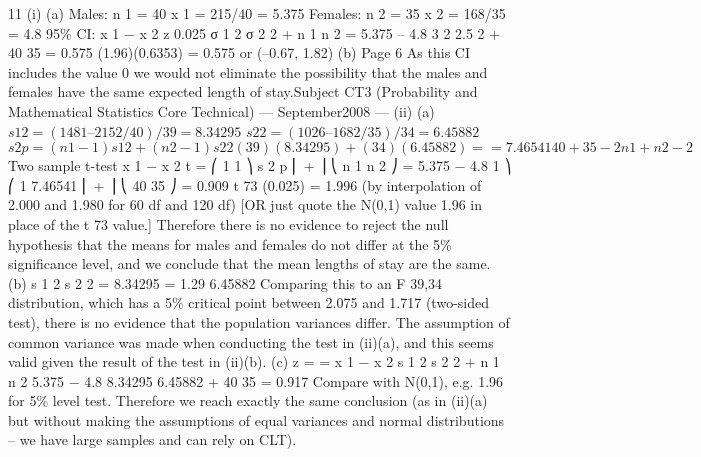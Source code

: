 \documentclass[a4paper,12pt]{article}
\begin{document}
11
(i)
(a)
Males: n 1 = 40
x 1 = 215/40 = 5.375
Females: n 2 = 35 x 2 = 168/35 = 4.8
95\% CI:
x 1 − x 2 \pm z 0.025
σ 1 2 σ 2 2
+
n 1 n 2
= 5.375 – 4.8 
3 2 2.5 2
+
40 35
= 0.575 \pm (1.96)(0.6353)
= 0.575  or (–0.67, 1.82)
(b)
Page 6
As this CI includes the value 0 we would not eliminate the possibility
that the males and females have the same expected length of stay.Subject CT3 (Probability and Mathematical Statistics Core Technical) — September2008 — %
(ii)
(a)
$s 1 2 = (1481 – 215 2 /40)/39 = 8.34295$
$s 2 2 = (1026 – 168 2 /35)/34 = 6.45882$
$s 2 p =
( n 1 − 1) s 1 2 + ( n 2 − 1) s 2 2
(39)(8.34295) + (34)(6.45882)
=
= 7.46541
40 + 35 − 2
n 1 + n 2 − 2$
Two sample t-test
x 1 − x 2
t =
⎛ 1 1 ⎞
s 2 p ⎜ + ⎟
⎝ n 1 n 2 ⎠
=
5.375 − 4.8
1 ⎞
⎛ 1
7.46541 ⎜ + ⎟
⎝ 40 35 ⎠
= 0.909
t 73 (0.025) = 1.996 (by interpolation of 2.000 and 1.980 for 60 df and
120 df)
[OR just quote the N(0,1) value 1.96 in place of the t 73 value.]
Therefore there is no evidence to reject the null hypothesis that the means for males and females do not differ at the 5\% significance level,
and we conclude that the mean lengths of stay are the same.
(b)
s 1 2
s 2 2
=
8.34295
= 1.29
6.45882
Comparing this to an F 39,34 distribution, which has a 5\% critical point between 2.075 and 1.717 (two-sided test), there is no evidence that the population variances differ.
The assumption of common variance was made when conducting the test in (ii)(a), and this seems valid given the result of the test in (ii)(b).
(c)
z =
=
x 1 − x 2
s 1 2 s 2 2
+
n 1 n 2
5.375 − 4.8
8.34295 6.45882
+
40
35
= 0.917
Compare with N(0,1), e.g. 1.96 for 5\% level test. Therefore we reach exactly the same conclusion (as in (ii)(a) but without making the assumptions of equal variances and normal distributions – we have
large samples and can rely on CLT).
\end{document}

